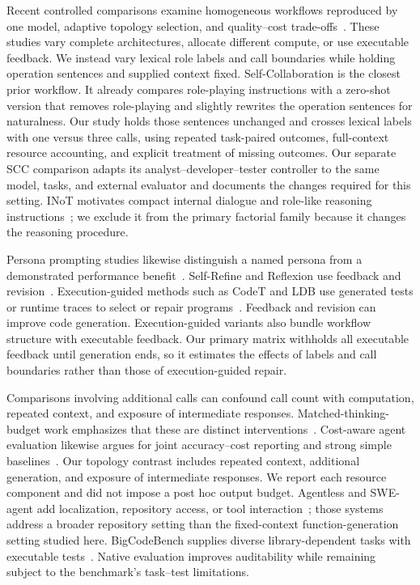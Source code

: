 Recent controlled comparisons examine homogeneous workflows reproduced by one model, adaptive topology selection, and quality--cost trade-offs~\cite{xu2026oneflow,hong2026dats,kapoor2025agents}. These studies vary complete architectures, allocate different compute, or use executable feedback. We instead vary lexical role labels and call boundaries while holding operation sentences and supplied context fixed. Self-Collaboration is the closest prior workflow. It already compares role-playing instructions with a zero-shot version that removes role-playing and slightly rewrites the operation sentences for naturalness. Our study holds those sentences unchanged and crosses lexical labels with one versus three calls, using repeated task-paired outcomes, full-context resource accounting, and explicit treatment of missing outcomes. Our separate SCC comparison adapts its analyst--developer--tester controller to the same model, tasks, and external evaluator and documents the changes required for this setting. INoT motivates compact internal dialogue and role-like reasoning instructions~\cite{sun2025inot}; we exclude it from the primary factorial family because it changes the reasoning procedure.



Persona prompting studies likewise distinguish a named persona from a demonstrated performance benefit~\cite{zheng2024personas,araujo2025personas}. Self-Refine and Reflexion use feedback and revision~\cite{madaan2023selfrefine,shinn2023reflexion}. Execution-guided methods such as CodeT and LDB use generated tests or runtime traces to select or repair programs~\cite{chen2023codet,zhong2024ldb}. Feedback and revision can improve code generation. Execution-guided variants also bundle workflow structure with executable feedback. Our primary matrix withholds all executable feedback until generation ends, so it estimates the effects of labels and call boundaries rather than those of execution-guided repair.

Comparisons involving additional calls can confound call count with computation, repeated context, and exposure of intermediate responses. Matched-thinking-budget work emphasizes that these are distinct interventions~\cite{tran2026budget}. Cost-aware agent evaluation likewise argues for joint accuracy--cost reporting and strong simple baselines~\cite{kapoor2025agents}. Our topology contrast includes repeated context, additional generation, and exposure of intermediate responses. We report each resource component and did not impose a post hoc output budget. Agentless and SWE-agent add localization, repository access, or tool interaction~\cite{xia2025agentless,yang2024sweagent}; those systems address a broader repository setting than the fixed-context function-generation setting studied here. BigCodeBench supplies diverse library-dependent tasks with executable tests~\cite{zhuo2024bigcodebench}. Native evaluation improves auditability while remaining subject to the benchmark's task--test limitations.

